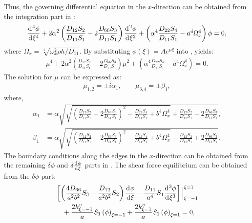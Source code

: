 \documentclass[preprint,12pt]{elsarticle}
\newcommand{\id}{\mathrm{d}\mkern1mu}
\begin{document}
Thus, the governing differential equation in the \( x \)-direction can be obtained from the integration part in :
%
\begin{equation}\label{eq:ODEx}
		\frac{\id^4 \phi}{\id \xi^4}+ 2\alpha^2\left(\frac{D_{12}S_2}{D_{11}S_1}-2\frac{D_{66}S_3}{D_{11}S_1}\right)\frac{\id^2 \phi}{\id \xi^2}+\left(\alpha^4\frac{D_{22}S_4}{D_{11}S_1}-a^4\Omega_x^4\right)\phi=0,
\end{equation}
%
where \(\Omega_x = \sqrt[4]{\omega_x^2 \rho h / D_{11}}\).
By substituting \(\phi(\xi) = A e^{\mu \xi}\) into , yields:
%
\begin{equation}\label{eq:ODEx2}
	\begin{split}
		\mu^4 + 2\alpha^2\left(\frac{D_{12}S_2}{D_{11}S_1}-2\frac{D_{66}S_3}{D_{11}S_1}\right)\mu^2 + \left(\alpha^4\frac{D_{22}S_4}{D_{11}S_1}-a^4\Omega_x^4\right) = 0.
	\end{split}
\end{equation}
%
The solution for \(\mu\) can be expressed as:
%
\begin{equation}\label{eq:mu}
	\begin{split}
		\mu_{1,2} = \pm\textit{i} \alpha_1, \qquad \mu_{3,4} = \pm \beta_1,
	\end{split}
\end{equation}
%
where,
%
\begin{subequations}\label{eq:alphax}
	\begin{align}
		\alpha_1 &= \alpha \sqrt{\sqrt{\left(\frac{D_{12}S_2}{D_{11}S_1}-2\frac{D_{66}S_3}{D_{11}S_1}\right)^2 - \frac{D_{22}S_4}{D_{11}S_1} + b^4\Omega_x^4} + \frac{D_{12}S_2}{D_{11}S_1} - 2\frac{D_{66}S_3}{D_{11}S_1}},\label{eq:alphax1}\\
		\beta_1 &= \alpha \sqrt{\sqrt{\left(\frac{D_{12}S_2}{D_{11}S_1}-2\frac{D_{66}S_3}{D_{11}S_1}\right)^2 - \frac{D_{22}S_4}{D_{11}S_1} + b^4\Omega_x^4} - \frac{D_{12}S_2}{D_{11}S_1} + 2\frac{D_{66}S_3}{D_{11}S_1}}.\label{eq:alphax2}
	\end{align}
\end{subequations}
%
The boundary conditions along the edges in the \(x\)-direction can be obtained from the remaining \(\delta \phi\) and \(\delta \frac{\id \phi}{\id \xi}\) parts in . 
The shear force equilibrium can be obtained from the \(\delta \phi\) part:
%
\begin{equation}\label{eq:inertial_forcex}
	\begin{split}
		&\left[ \left( \frac{4D_{66}}{a^2b^2} S_3 - \frac{D_{12}}{a^2b^2} S_2 \right) \frac{\id \phi}{\id \xi} 
		- \frac{D_{11}}{a^4} S_1 \frac{\id^3 \phi}{\id \xi^3} \right] \Big|^{\xi=1}_{\xi=-1}\\
		&\quad+ \frac{2k^v_{\xi=-1}}{a} S_1 \left(\phi\right)_{\xi=-1}
		 + \frac{2k^v_{\xi=1}}{a} S_1 \left(\phi\right)_{\xi=1} = 0,
	\end{split}
\end{equation}
\end{document}
